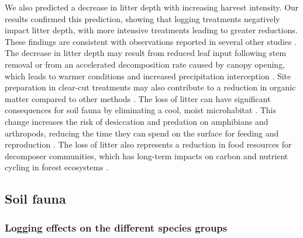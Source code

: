 We also predicted a decrease in litter depth with increasing harvest intensity. 
Our results confirmed this prediction, showing that logging treatments negatively impact litter depth, with more intensive treatments leading to greater reductions. 
These findings are consistent with observations reported in several other studies \citep{Marshall2000Impactsforest,Mazerolle2021Woodlandsalamander}. 
The decrease in litter depth may result from reduced leaf input following stem removal or from an accelerated decomposition rate caused by canopy opening, 
which leads to warmer conditions and increased precipitation interception \citep{Fierer2005LitterQuality,Butenschoen2011Interactiveeffects,Ameray2021Forestcarbon}. 
Site preparation in clear-cut treatments may also contribute to a reduction in organic matter compared to other methods \citep{Prevost1992Effetsscarifiage}. 
The loss of litter can have significant consequences for soil fauna by eliminating a cool, moist microhabitat \citep{spotilaRoleTemperatureWater1972,groverInfluenceCoverMoisture1998a,Niemela2007effectsforestry}. 
This change increases the risk of desiccation and predation on amphibians and arthropods, reducing the time they can spend on the surface for feeding and reproduction \citep{deMaynadier1995relationshipforest,koivula.LeafLitterSmallscale1999,Walton2013Topdownregulation}. 
The loss of litter also represents a reduction in food resources for decomposer communities, which has long-term impacts on carbon and nutrient cycling in forest ecosystems \citep{Handa2014Consequencesbiodiversity}. 


\subsection*{Soil fauna}
\label{disc:soil_fauna}

\subsubsection*{Logging effects on the different species groups}
\label{disc:logging_effects}

